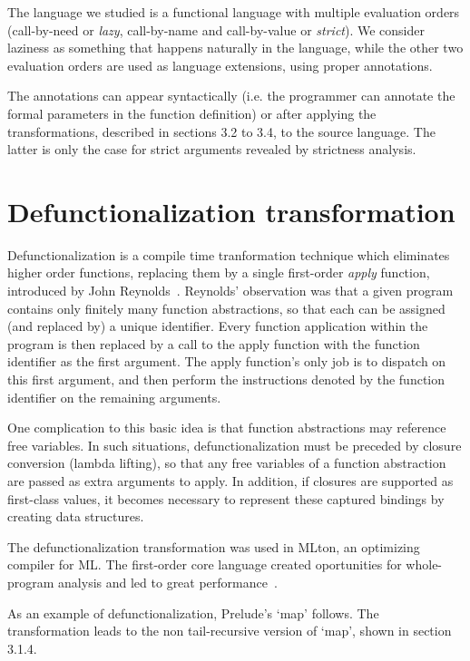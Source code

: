 \documentclass[diploma]{softlab-thesis}
\begin{document}
The language we studied is a functional language 
with multiple evaluation orders (call-by-need or 
\textit{lazy}, call-by-name and call-by-value or \textit{strict}).
We consider laziness as something that happens naturally in the language, while 
the other two evaluation orders are used as language extensions,
using proper annotations.

The annotations can appear syntactically (i.e. the programmer can annotate 
the formal parameters in the function definition) or 
after applying the transformations, described in sections 3.2 to 3.4, 
to the source language. The latter
is only the case for strict arguments revealed by strictness analysis.

\section {Defunctionalization transformation}

Defunctionalization is a compile time tranformation technique which eliminates higher order 
functions, replacing them by a single first-order \textit{apply} function, introduced by John Reynolds~\cite{Reynolds72definitionalinterpreters}.
Reynolds' observation was that a given program contains only finitely many function abstractions, so that each can 
be assigned (and replaced by) a unique identifier. Every function application within the program is then replaced 
by a call to the apply function with the function identifier as the first argument. The apply function's only job is 
to dispatch on this first argument, and then perform the instructions denoted by the function identifier on the 
remaining arguments.

One complication to this basic idea is that function abstractions may reference free variables. In such situations, 
defunctionalization must be preceded by closure conversion (lambda lifting), so that any free variables of a function 
abstraction are passed as extra arguments to apply. In addition, if closures are supported as first-class values, 
it becomes necessary to represent these captured bindings by creating data structures.

The defunctionalization transformation was used in MLton, an optimizing compiler for ML. The first-order
core language created oportunities for whole-program analysis and led to great performance~\cite{mlton}.

As an example of defunctionalization, Prelude's `map' follows. The transformation leads to 
the non tail-recursive version of `map', shown in section 3.1.4.
\end{document}
